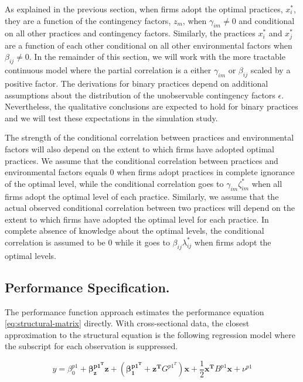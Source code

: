 \documentclass[12pt]{article}
\begin{document}
As explained in the previous section, when firms adopt the optimal practices, $x^*_i$, they are a function of the contingency factors, $z_m$, when $\gamma_{im} \neq 0$ and conditional on all other practices and contingency factors. Similarly, the practices $x^*_i$ and $x^*_j$ are a function of each other conditional on all other environmental factors when $\beta_{ij} \neq 0$. In the remainder of this section, we will work with the more tractable continuous model where the partial correlation is a either $\gamma_{im}$ or $\beta_{ij}$ scaled by a positive factor. The derivations for binary practices depend on additional assumptions about the distribution of the unobservable contingency factors $\epsilon$. Nevertheless, the qualitative conclusions are expected to hold for binary practices and we will test these expectations in the simulation study.

The strength of the conditional correlation between practices and environmental factors will also depend on the extent to which firms have adopted optimal practices. We assume that the conditional correlation between practices and environmental factors equals $0$ when firms adopt practices in complete ignorance of the optimal level, while the conditional correlation goes to $\gamma_{im}\zeta_{im}^*$ when all firms adopt the optimal level of each practice. Similarly, we assume that the actual observed conditional correlation between two practices will depend on the extent to which firms have adopted the optimal level for each practice. In complete absence of knowledge about the optimal levels, the conditional correlation is assumed to be $0$ while it goes to $\beta_{ij}\lambda_{ij}^*$ when firms adopt the optimal levels. 

\subsection{Performance Specification.}

The performance function approach estimates the performance equation \eqref{eq:structural-matrix} directly. With cross-sectional data, the closest approximation to the structural equation is the following regression model where the subscript for each observation is suppressed. 

\begin{equation*}
    y = \beta_0^{p1} + \mathbf{\beta_z^{p1^T} z} + (\mathbf{\beta_1^{p1^T}} + \mathbf{z^T} G^{p1^T}) \mathbf{x} + 
    \frac{1}{2}\mathbf{x^T} B^{p1} \mathbf{x} + \nu^{p1}
\end{equation*}
\end{document}
